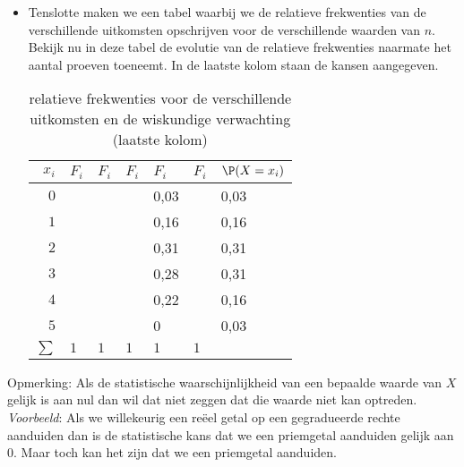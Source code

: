 \begin{small}
\begin{itemize}
\begin{itemize}
\item Tenslotte maken we een tabel waarbij we de relatieve frekwenties van de verschillende uitkomsten opschrijven voor de verschillende waarden van $n$.  Bekijk nu in  deze tabel  de evolutie van de relatieve frekwenties naarmate het aantal proeven toeneemt. In de laatste kolom staan de kansen aangegeven. 
\begin{table}[h]
\begin{center}
\begin{tabular}{|r|l|l|l|l|l|l|}
\hline
 $x_i$  & $F_i$ &     $F_i$      &    $F_i$      &   $F_i$   &$F_i$ &$\P(X=x_i)$\\
\hline
$0$ & \hspace{1cm} & \hspace{1cm} & \hspace{1cm} &0,03& &0,03
 \\
\hline
$1$ &  &  & &0,16 & &0,16\\
\hline
$2$ & &  &  & 0,31 & &0,31\\
\hline
$3$ & &  &  & 0,28& &0,31\\
\hline
$4$ &  & & & 0,22&&0,16\\ 
\hline
$5$ &  &  &  &  0 & &0,03\\
\hline
$\sum$ & $1$ & $1$ & $1$ & $1$ & $1$\\
\hline
\end{tabular}
\caption{relatieve frekwenties voor de verschillende uitkomsten en de wiskundige verwachting (laatste kolom)}
\end{center}
\end{table}




\end{itemize}

 
\end{itemize}
\end{small}





 
{\sc Opmerking}: Als de statistische waarschijnlijkheid van een bepaalde waarde van $X$  
gelijk is aan nul dan 
wil dat niet zeggen dat die waarde niet kan optreden. \\
{\em Voorbeeld}:  Als we willekeurig een re\"eel getal op een gegradueerde rechte aanduiden dan is de
 statistische kans dat we een priemgetal aanduiden gelijk aan 0. Maar toch kan het zijn dat we een priemgetal aanduiden. 



